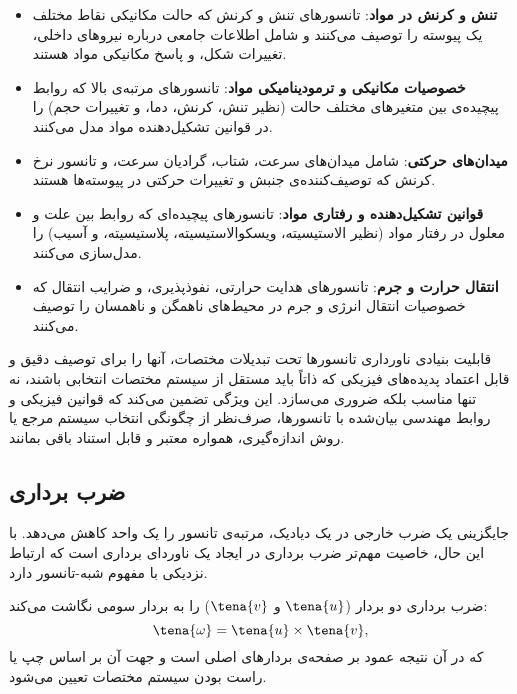 \begin{itemize}
    \item \textbf{تنش و کرنش در مواد}: تانسورهای تنش و کرنش که حالت مکانیکی نقاط مختلف یک پیوسته را توصیف می‌کنند و شامل اطلاعات جامعی درباره نیروهای داخلی، تغییرات شکل، و پاسخ مکانیکی مواد هستند.

    \item \textbf{خصوصیات مکانیکی و ترمودینامیکی مواد}: تانسورهای مرتبه‌ی بالا که روابط پیچیده‌ی بین متغیرهای مختلف حالت (نظیر تنش، کرنش، دما، و تغییرات حجم) را در قوانین تشکیل‌دهنده مواد مدل می‌کنند.

    \item \textbf{میدان‌های حرکتی}: شامل میدان‌های سرعت، شتاب، گرادیان سرعت، و تانسور نرخ کرنش که توصیف‌کننده‌ی جنبش و تغییرات حرکتی در پیوسته‌ها هستند.

    \item \textbf{قوانین تشکیل‌دهنده و رفتاری مواد}: تانسورهای پیچیده‌ای که روابط بین علت و معلول در رفتار مواد (نظیر الاستیسیته، ویسکوالاستیسیته، پلاستیسیته، و آسیب) را مدل‌سازی می‌کنند.

    \item \textbf{انتقال حرارت و جرم}: تانسورهای هدایت حرارتی، نفوذپذیری، و ضرایب انتقال که خصوصیات انتقال انرژی و جرم در محیط‌های ناهمگن و ناهمسان را توصیف می‌کنند.
\end{itemize}

قابلیت بنیادی ناورداری تانسورها تحت تبدیلات مختصات، آنها را برای توصیف دقیق و قابل اعتماد پدیده‌های فیزیکی که ذاتاً باید مستقل از سیستم مختصات انتخابی باشند، نه تنها مناسب بلکه ضروری می‌سازد. این ویژگی تضمین می‌کند که قوانین فیزیکی و روابط مهندسی بیان‌شده با تانسورها، صرف‌نظر از چگونگی انتخاب سیستم مرجع یا روش اندازه‌گیری، همواره معتبر و قابل استناد باقی بمانند.

\subsection{ضرب برداری}
جایگزینی یک ضرب خارجی در یک دیادیک، مرتبه‌ی تانسور را یک واحد کاهش می‌دهد. با این حال، خاصیت مهم‌تر ضرب برداری در ایجاد یک ناوردای برداری است که ارتباط نزدیکی با مفهوم شبه-تانسور دارد.

\begin{definition}
    ضرب برداری دو بردار ($\tena{u}$ و $\tena{v}$) را به بردار سومی نگاشت می‌کند:
    \begin{equation}
        \tena{\omega}=\tena{u}\times\tena{v},
    \end{equation}
    که در آن نتیجه عمود بر صفحه‌ی بردارهای اصلی است و جهت آن بر اساس چپ یا راست بودن سیستم مختصات تعیین می‌شود.
\end{definition}

